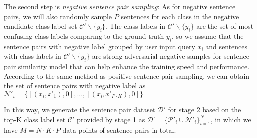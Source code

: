 \begin{table*}
  \begin{centering}
    \par
  \end{centering}
  \caption{Statistics for all datasets and few shot settings.}

  \label{tbe:dataset statistic}
\end{table*}


The  second  step  is  \emph{negative sentence pair sampling}: As for negative
sentence  pairs,  we will also randomly sample $P$ sentences for each class in
the negative candidate class label set $\mathcal{C'}\backslash \{y_{i}\}$. The
class  labels  in  $\mathcal{C'}\backslash  \{y_{i}\}$  are  the  set  of most
confusing  class  labels comparing to the ground truth ${y_{i}}$, so we assume
that  the  sentence  pairs  with  negative  label  grouped by user input query
$x_{i}$  and sentences with class labels in $\mathcal{C'}\backslash \{y_{i}\}$
are  strong  adversarial  negative  samples for sentence-pair similarity model
that  can  help  enhance  the training speed and performance. According to the
same  method  as  positive  sentence  pair  sampling, we can obtain the set of
sentence  pairs  with  negative label as $\mathcal{N'}_{i}=\{[(x_{i}, x'_{1}),
0], ..., [(x_{i}, x'_{P\cdot K}), 0]\}$

In  this way, we generate the sentence pair dataset $\mathcal{D'}$ for stage 2
based  on  the  top-K  class  label  set $\mathcal{C'}$ provided by stage 1 as
$\mathcal{D'}=\{\mathcal{P'}_{i}\cup  \mathcal{N'}_{i}\}_{i=1}^{N}$,  in which
we have $M=N\cdot K\cdot P$ data points of sentence pairs in total.

